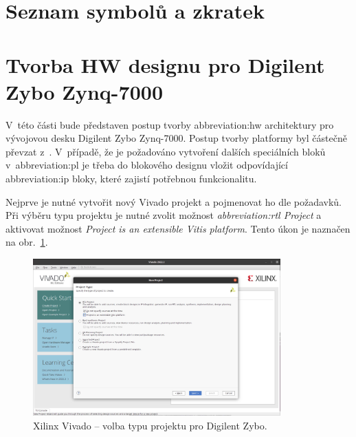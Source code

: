 \documentclass[a4paper, twoside, 11pt]{article}
\newcommand{\fbar}{\FloatBarrier}
\begin{document}
	\begin{appendices}
	\section{Seznam symbolů a zkratek}

		\printglossary[type=abbreviationslist, style = myStyleAbbreviations]

		\fbar
		\newpage
		\printglossary[type=symbolslist, style =  myStyleSymbols]

		\newpage
		\section{Tvorba HW designu pro Digilent Zybo Zynq-7000}\label{sec:appendicies:-tvorba-hw-designu-pro-digilent-zybo-zynq-7000}
		V~této části bude představen postup tvorby \gls{abbreviation:hw} architektury pro vývojovou desku Digilent Zybo Zynq-7000. Postup tvorby platformy byl částečně převzat z~\cite{hackster-vitis-2021-1-embedded-platform-for-zybo-z7-20}. V~případě, že je požadováno vytvoření dalších speciálních bloků v~\gls{abbreviation:pl} je třeba do blokového designu vložit odpovídající \gls{abbreviation:ip} bloky, které zajistí potřebnou funkcionalitu.\par
		Nejprve je nutné vytvořit nový Vivado projekt a pojmenovat ho dle požadavků. Při výběru typu projektu je nutné zvolit možnost \textit{\gls{abbreviation:rtl} Project} a aktivovat možnost \textit{Project is an extensible Vitis platform}. Tento úkon je naznačen na obr.~\ref{fig:zybo-xilinx-vivado-flow-01}.

			\begin{figure}[htbp!]
				\centering
				\includegraphics[width=0.85\textwidth]{src/png/zybo-xilinx-vivado-flow/zybo-xilinx-vivado-flow-01.jpg}
				\caption{Xilinx Vivado – volba typu projektu pro Digilent Zybo.}
				\label{fig:zybo-xilinx-vivado-flow-01}
			\end{figure}


\end{appendices}
\end{document}
